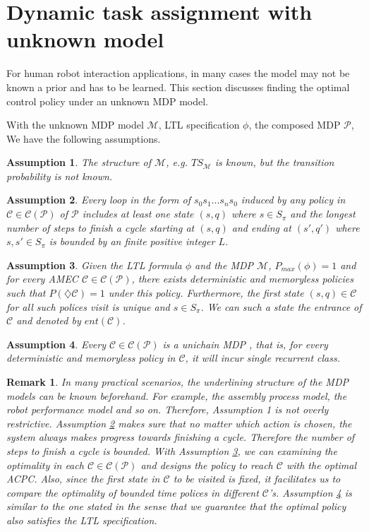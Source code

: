 \documentclass[journal]{IEEEtran}
\newtheorem{assumption}{Assumption}
\newtheorem{remark}{Remark}
\begin{document}
\section{Dynamic task assignment with unknown model}\label{sec:approxi}
For human robot interaction applications, in many cases the  model may not be known a prior and has to be learned. This section discusses finding the optimal control policy under an unknown MDP model.


With the unknown MDP model $\mathcal{M}$, LTL specification $\phi$, the composed MDP $\mathcal{P}$, We have the following assumptions. 
\begin{assumption}\label{assump:structure}
	The structure of $\mathcal{M}$, e.g. $TS_{\mathcal{M}}$ is known, but the transition probability is not known.
\end{assumption}
\begin{assumption}\label{assump:loop}
	Every loop in the form of $s_0s_1...s_ns_0$ induced by any policy in $\mathcal{C}\in \mathcal{C}(\mathcal{P})$ of $\mathcal{P}$ includes at least one state $(s,q)$ where $s\in S_\pi$ and the longest number of steps to finish a cycle starting at $(s,q)$ and ending at $(s',q')$ where $s,s'\in S_\pi$ is bounded by an finite positive integer $L$.
\end{assumption}
\begin{assumption}\label{assump:AMEC}
	Given the LTL formula $\phi$ and the MDP $\mathcal{M}$, $P_{max}(\phi)=1$ and for every AMEC $\mathcal{C}\in \mathcal{C}(\mathcal{P})$, there exists deterministic and memoryless policies such that $P(\diamondsuit \mathcal{C}) =1$ under this policy. Furthermore, the first state $(s,q)\in \mathcal{C}$ for all such polices visit is unique and $s\in S_\pi$. We can such a state the entrance of $\mathcal{C}$ and denoted by $ent(\mathcal{C})$. 
\end{assumption}
\begin{assumption}\label{assump:LTL}
	Every $\mathcal{C}\in \mathcal{C}(\mathcal{P})$ is a unichain MDP \cite{puterman2014markov}, that is, for every deterministic and memoryless policy in $\mathcal{C}$, it will incur single recurrent class.
\end{assumption}
\begin{remark}
	In many practical scenarios, the underlining structure of the MDP models can be known beforehand. For example, the assembly process model, the robot performance model and so on. Therefore, Assumption 1 is not overly restrictive. Assumption \ref{assump:loop} makes sure that no matter which action is chosen, the system always makes progress towards finishing a cycle. Therefore the number of steps to finish a cycle is bounded. With Assumption \ref{assump:AMEC}, we can examining the optimality in each $\mathcal{C}\in \mathcal{C}(\mathcal{P})$ and designs the policy to reach $\mathcal{C}$ with the optimal ACPC. Also, since the first state in $\mathcal{C}$ to be visited is fixed, it facilitates us to compare the optimality of bounded time polices in different $\mathcal{C}$'s. Assumption \ref{assump:LTL} is similar to the one stated \cite{ding2014optimal} in the sense that we guarantee that the optimal policy also satisfies the LTL specification.
\end{remark}
\end{document}
